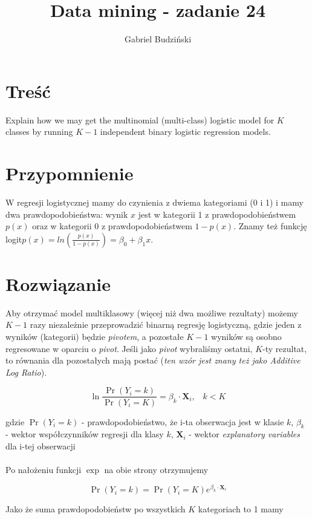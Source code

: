 \documentclass{article}
\title{Data mining {-} zadanie 24}
\author{Gabriel Budziński}
\begin{document}
\maketitle

\section{Treść}

Explain how we may get the multinomial (multi-class) logistic model for $K$ classes by running $K - 1$ independent binary logistic regression models.

\section{Przypomnienie}

W regresji logistycznej mamy do czynienia z dwiema kategoriami (0 i 1) i mamy dwa prawdopodobieństwa: wynik $x$ jest w kategorii 1 z prawdopodobieństwem $p(x)$ oraz w kategorii 0 z prawdopodobieństwem $1 - p(x)$. Znamy też funkcję logit$p(x) = ln\left(\frac{p(x)}{1-p(x)}\right) = \beta_0 + \beta_1x$. 

\section{Rozwiązanie}

Aby otrzymać model multiklasowy (więcej niż dwa możliwe rezultaty) możemy $K - 1$ razy niezależnie przeprowadzić binarną regresję logistyczną, gdzie jeden z wyników (kategorii) będzie \textit{pivotem}, a pozostałe $K - 1$ wyników są osobno regresowane w oparciu o \textit{pivot}. Jeśli jako \textit{pivot} wybraliśmy ostatni, $K$-ty rezultat, to równania dla pozostałych mają postać (\textit{ten wzór jest znany też jako Additive Log Ratio}).

\[\ln\frac{\Pr(Y_i =k)}{\Pr(Y_i = K)} = \beta_k \cdot \mathbf{X}_i, \hspace{10pt} k < K\]

gdzie $\Pr(Y_i = k)$ - prawdopodobieństwo, że i-ta obserwacja jest w klasie $k$, $\beta_k$ - wektor współczynników regresji dla klasy $k$, $\mathbf{X}_i$ - wektor \textit{explanatory variables} dla i-tej obserwacji
\\\\
Po nałożeniu funkcji $\exp$ na obie strony otrzymujemy

\[\Pr(Y_i = k) =\Pr(Y_i = K) e^{\beta_k \cdot \mathbf{X}_i}\]

Jako że suma prawdopodobieństw po wszystkich $K$ kategoriach to 1 mamy
\end{document}
